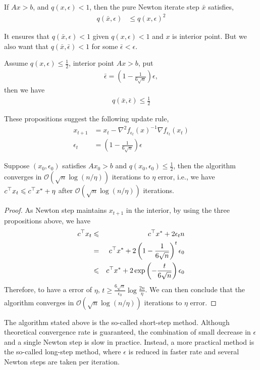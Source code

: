 \begin{proposition}\label{prop2}
If $Ax>b$, and $q(x,\epsilon)<1$, then the pure Newton iterate
step $\bar{x}$ satisfies,
\begin{align}
q(\bar{x}, \epsilon) &\leq q(x, \epsilon)^2 
\end{align}
\end{proposition}
It ensures that $q(\bar{x}, {\epsilon})<1$ given $q(x,\epsilon)<1$ and $x$ is interior point. But we also want that $q(\bar{x}, \bar{\epsilon})<1$ for some $\bar{\epsilon}<\epsilon$. 

\begin{proposition}\label{prop3}
Assume $q(x,\epsilon)\leq \frac{1}{2}$, interior point $Ax>b$,
put 
\begin{align}
\bar{\epsilon} = \left(1-\frac{1}{6\sqrt{n}}\right)\epsilon,
\end{align}
then we have
\begin{align}
q(\bar{x}, \bar{\epsilon})\leq \frac{1}{2}
\end{align}
\end{proposition}
These propositions suggest the following update rule,
\begin{align}
x_{t+1} & = x_t - \nabla^2 f_{\epsilon_t}(x)^{-1}\nabla f_{\epsilon_t}(x_t) \\
\epsilon_t & = \left(1-\frac{1}{6\sqrt{n}}\right)\epsilon
\end{align}
\begin{theorem}
Suppose $(x_0, \epsilon_0)$ satisfies $Ax_0 >b$ and 
$q(x_0,\epsilon_0)\leq\frac{1}{2}$, then the algorithm
converges in $\mathcal{O}(\sqrt{n}\log(n/\eta))$ iterations to $\eta$ error, i.e., we have $c^\top x_t\leqslant{c^\top x^*+\eta}$ after $\mathcal{O}(\sqrt{n}\log(n/\eta))$ iterations.
\end{theorem}

\begin{proof}
As Newton step maintains $x_{t+1}$ in the interior, by using the three propositions above, we have 
\begin{eqnarray}
c^\top x_t&\leqslant&{c^\top x^*+2\epsilon_t{n}}\nonumber\\
&=&{c^\top x^*+2\left(1-\frac{1}{6\sqrt{n}}\right)^t\epsilon_0}\nonumber\\
&\leqslant&{c^\top x^*+2\exp\left(-\frac{t}{6\sqrt{n}}\right)\epsilon_0}
\end{eqnarray}
Therefore, to have a error of $\eta$, $t\geqslant{\frac{6\sqrt{n}}{\epsilon_0}}\log{\frac{2n}{\eta}}$. We can then conclude that the algorithm converges in  $\mathcal{O}(\sqrt{n}\log(n/\eta))$ iterations to $\eta$ error. 
\end{proof}

The algorithm stated above is the so-called short-step method. Although theoretical convergence rate is guaranteed, the combination of small decrease in $\epsilon$ and a single Newton step is slow in practice. Instead, a more practical method is the so-called long-step method, where $\epsilon$ is reduced in faster rate and several Newton steps are taken per iteration.
